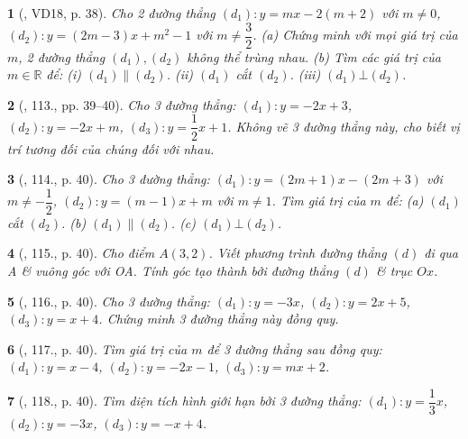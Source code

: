 \documentclass{article}
\newtheorem{baitoan}{}
\begin{document}
\begin{baitoan}[\cite{Tuyen_Toan_9_old}, VD18, p. 38]
	Cho 2 đường thẳng $(d_1):y = mx - 2(m + 2)$ với $m\ne0$, $(d_2):y = (2m - 3)x + m^2 - 1$ với $m\ne\dfrac{3}{2}$. (a) Chứng minh với mọi giá trị của $m$, 2 đường thẳng $(d_1),(d_2)$ không thể trùng nhau. (b) Tìm các giá trị của $m\in\mathbb{R}$ để: (i) $(d_1)\parallel(d_2)$. (ii) $(d_1)$ cắt $(d_2)$. (iii) $(d_1)\bot(d_2)$.
\end{baitoan}

\begin{baitoan}[\cite{Tuyen_Toan_9_old}, 113., pp. 39--40]
	Cho 3 đường thẳng: $(d_1):y = -2x + 3$, $(d_2):y = -2x + m$, $(d_3):y = \dfrac{1}{2}x + 1$. Không vẽ 3 đường thẳng này, cho biết vị trí tương đối của chúng đối với nhau.
\end{baitoan}

\begin{baitoan}[\cite{Tuyen_Toan_9_old}, 114., p. 40]
	Cho 3 đường thẳng: $(d_1):y = (2m + 1)x - (2m + 3)$ với $m\ne-\dfrac{1}{2}$, $(d_2):y = (m - 1)x + m$ với $m\ne1$. Tìm giá trị của $m$ để: (a) $(d_1)$ cắt $(d_2)$. (b) $(d_1)\parallel(d_2)$. (c) $(d_1)\bot(d_2)$.
\end{baitoan}

\begin{baitoan}[\cite{Tuyen_Toan_9_old}, 115., p. 40]
	Cho điểm $A(3,2)$. Viết phương trình đường thẳng $(d)$ đi qua A \& vuông góc với OA. Tính góc tạo thành bởi đường thẳng $(d)$ \& trục $Ox$.
\end{baitoan}

\begin{baitoan}[\cite{Tuyen_Toan_9_old}, 116., p. 40]
	Cho 3 đường thẳng: $(d_1):y = -3x$, $(d_2):y = 2x + 5$, $(d_3):y = x + 4$. Chứng minh 3 đường thẳng này đồng quy.
\end{baitoan}

\begin{baitoan}[\cite{Tuyen_Toan_9_old}, 117., p. 40]
	Tìm giá trị của $m$ để 3 đường thẳng sau đồng quy: $(d_1):y = x - 4$, $(d_2):y = -2x - 1$, $(d_3):y = mx + 2$.
\end{baitoan}

\begin{baitoan}[\cite{Tuyen_Toan_9_old}, 118., p. 40]
	Tìm diện tích hình giới hạn bởi 3 đường thẳng: $(d_1):y = \dfrac{1}{3}x$, $(d_2):y = -3x$, $(d_3):y = -x + 4$.
\end{baitoan}

\end{document}
